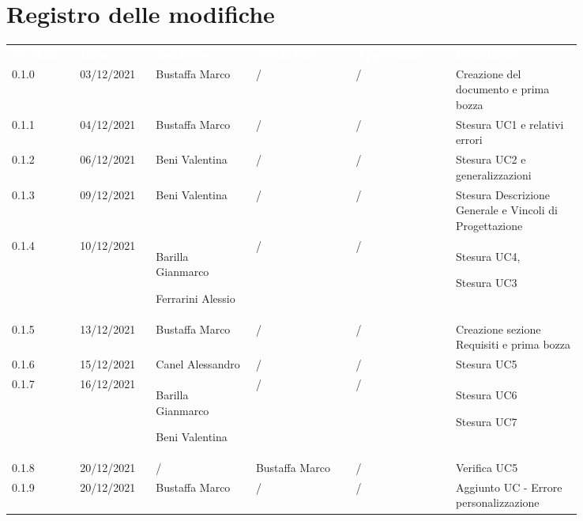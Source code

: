 \section*{Registro delle modifiche}

{\renewcommand{\arraystretch}{1.5}
\scriptsize
\begin{tabular}{p{0.10\linewidth}p{0.10\linewidth}p{0.15\linewidth}p{0.15\linewidth}p{0.15\linewidth}p{0.19\linewidth}}
	\rowcolor[RGB]{33, 73, 50}
	\textcolor{white}{\textbf{Versione}} & \textcolor{white}{\textbf{Data}} & 
	\textcolor{white}{\textbf{Redattore}} & \textcolor{white}{\textbf{Verificatore}} & 
	\textcolor{white}{\textbf{Approvatore}} & \textcolor{white}{\textbf{Descrizione}}\\
	\rowcolor[RGB]{216, 235, 171}
	0.1.0 & 03/12/2021 & Bustaffa Marco& / &/& Creazione del documento e prima bozza\\
	\rowcolor[RGB]{233, 245, 206}
	0.1.1 & 04/12/2021 & Bustaffa Marco& / &/& Stesura UC1 e relativi errori\\
	\rowcolor[RGB]{216, 235, 171}
	0.1.2 & 06/12/2021 & Beni Valentina& / &/& Stesura UC2 e generalizzazioni\\
	\rowcolor[RGB]{233, 245, 206}
	0.1.3 & 09/12/2021 & Beni Valentina& / &/& Stesura Descrizione Generale e Vincoli di Progettazione \\
	\rowcolor[RGB]{216, 235, 171}
	0.1.4 & 10/12/2021 & Barilla Gianmarco \par Ferrarini Alessio& / &/& Stesura UC4, \par Stesura UC3 \\
	\rowcolor[RGB]{233, 245, 206}
	0.1.5 & 13/12/2021 & Bustaffa Marco& / &/& Creazione sezione Requisiti e prima bozza\\
	\rowcolor[RGB]{216, 235, 171}
	0.1.6 & 15/12/2021 & Canel Alessandro& /&/& Stesura UC5\\
	\rowcolor[RGB]{233, 245, 206}
	0.1.7 & 16/12/2021 & Barilla Gianmarco \par Beni Valentina& / &/& Stesura UC6 \par Stesura UC7\\
	\rowcolor[RGB]{216, 235, 171}
	0.1.8 & 20/12/2021 & / & Bustaffa Marco& /& Verifica UC5\\
	\rowcolor[RGB]{233, 245, 206}
	0.1.9 & 20/12/2021 & Bustaffa Marco& / &/& Aggiunto UC - Errore personalizzazione
\end{tabular}	
}